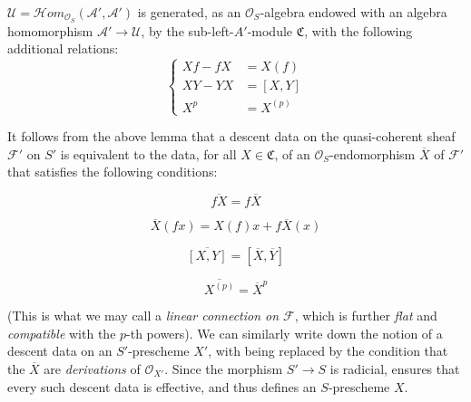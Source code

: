\begin{lemma}\label{fga3.i-b.3-lemma}
    $\mathcal{U}=\mathcal{H}om_{\mathcal{O}_S}(\mathcal{A}',\mathcal{A}')$ is generated, as an $\mathcal{O}_S$-algebra endowed with an algebra homomorphism $\mathcal{A}'\to\mathcal{U}$, by the sub-left-$A'$-module $\mathfrak{C}$, with the following additional relations:
    \begin{equation}\tag{3.6}\label{fga3.i-b.3-equation-3.6}
        \begin{cases}
            Xf-fX & = X(f)
            \\XY-YX &= [X,Y]
            \\X^p &= X^{(p)}
        \end{cases}
    \end{equation}
\end{lemma}


It follows from the above lemma that a descent data on the quasi-coherent sheaf $\mathcal{F}'$ on $S'$ is equivalent to the data, for all $X\in\mathfrak{C}$, of an $\mathcal{O}_S$-endomorphism $\overline{X}$ of $\mathcal{F}'$ that satisfies the following conditions:

\begin{equation}\tag{3.7}\label{fga3.i-b.3-equation-3.7}
    \overline{fX} = f\overline{X}
\end{equation}

\begin{equation}\tag{3.8}\label{fga3.i-b.3-equation-3.8}
    \overline{X}(fx) = X(f)x + f\overline{X}(x)
\end{equation}

\begin{equation}\tag{3.9}\label{fga3.i-b.3-equation-3.9}
    \overline{[X,Y]} = [\overline{X},\overline{Y}]
\end{equation}

\begin{equation}\tag{3.10}\label{fga3.i-b.3-equation-3.10}
    \overline{X^{(p)}} = \overline{X}^p
\end{equation}

(This is what we may call a \emph{linear connection on $\mathcal{F}$}, which is further \emph{flat} and \emph{compatible} with the $p$-th powers).
We can similarly write down the notion of a descent data on an $S'$-prescheme $X'$, with  being replaced by the condition that the $\overline{X}$ are \emph{derivations} of $\mathcal{O}_{X'}$.
Since the morphism $S'\to S$ is radicial,  ensures that every such descent data is effective, and thus defines an $S$-prescheme $X$.


